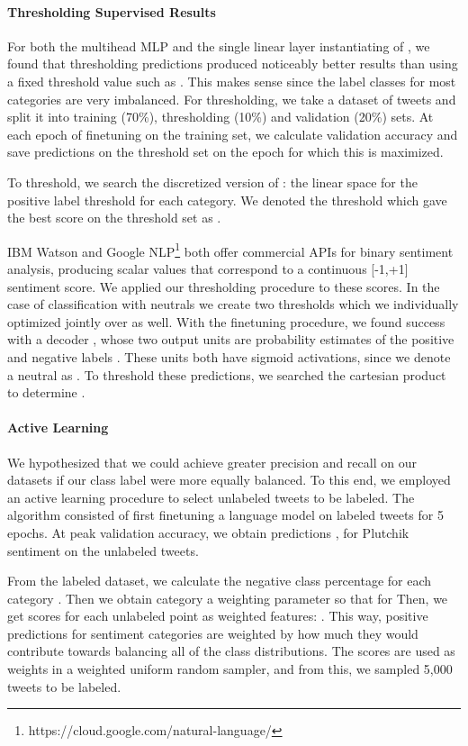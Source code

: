 \documentclass[letterpaper]{article} \usepackage{aaai19}  \usepackage{times}  \usepackage{helvet}  \usepackage{courier}  \usepackage{url}  \usepackage{graphicx}  \usepackage{booktabs}
\begin{document}
\paragraph{Thresholding Supervised Results}
For both the multihead MLP and the single linear layer instantiating of , we found that thresholding predictions produced noticeably better results than using a fixed threshold value such as . This makes sense since the label classes for most categories are very imbalanced. For thresholding, we take a dataset of tweets and split it into training (70\%), thresholding (10\%) and validation (20\%) sets. At each epoch of finetuning on the training set, we calculate validation accuracy and save predictions on the threshold set on the epoch for which this is maximized. 

To threshold, we search the discretized version of \text{[0, 1]}: the linear space  for the positive label threshold for each category. We denoted the threshold which gave the best score on the threshold set as . 

IBM Watson and Google NLP\footnote{https://cloud.google.com/natural-language/} both offer commercial APIs for binary sentiment analysis, producing scalar values that correspond to a continuous [-1,+1] sentiment score. We applied our thresholding procedure to these scores. In the case of classification with neutrals we create two thresholds  which we individually optimized jointly over  as well. With the finetuning procedure, we found success with a decoder , whose two output units  are probability estimates of the positive and negative labels . These units both have sigmoid activations, since we denote a neutral as . To threshold these predictions, we searched the cartesian product  to determine . 

\paragraph{Active Learning}
We hypothesized that we could achieve greater precision and recall on our datasets if our class label were more equally balanced. To this end, we employed an active learning procedure to select unlabeled tweets to be labeled. The algorithm consisted of first finetuning a language model  on labeled tweets for 5 epochs. At peak validation accuracy, we obtain predictions , for Plutchik sentiment on the unlabeled tweets. 

From the labeled dataset, we calculate the negative class percentage for each category . Then we obtain category a weighting parameter  so that  for  Then, we get scores for each unlabeled point as weighted features: . This way, positive predictions for sentiment categories are weighted by how much they would contribute towards balancing all of the class distributions. The scores  are used as weights in a weighted uniform random sampler, and from this, we sampled 5,000 tweets to be labeled. 
\end{document}
